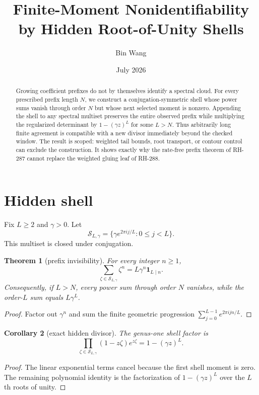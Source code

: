 \documentclass[11pt]{article}
\title{Finite-Moment Nonidentifiability by Hidden Root-of-Unity Shells}
\author{Bin Wang}\date{July 2026}
\newtheorem{theorem}{Theorem}[section]
\newtheorem{corollary}[theorem]{Corollary}
\theoremstyle{remark}\newtheorem{remark}[theorem]{Remark}
\begin{document}
\maketitle
\begin{abstract}
Growing coefficient prefixes do not by themselves identify a spectral cloud.
For every prescribed prefix length $N$, we construct a conjugation-symmetric
shell whose power sums vanish through order $N$ but whose next selected
moment is nonzero.  Appending the shell to any spectral multiset preserves
the entire observed prefix while multiplying the regularized determinant by
$1-(\gamma z)^L$ for some $L>N$.  Thus arbitrarily long finite agreement is
compatible with a new divisor immediately beyond the checked window.  The
result is scoped: weighted tail bounds, root transport, or contour control can
exclude the construction.  It shows exactly why the rate-free prefix theorem
of RH-287 cannot replace the weighted gluing leaf of RH-288.
\end{abstract}

\section{Hidden shell}
Fix $L\ge2$ and $\gamma>0$.  Let
\[
 \mathcal S_{L,\gamma}
 =\{\gamma e^{2\pi i j/L}:0\le j<L\}.
\]
This multiset is closed under conjugation.

\begin{theorem}[prefix invisibility]\label{thm:shell}
For every integer $n\ge1$,
\[
 \sum_{\zeta\in\mathcal S_{L,\gamma}}\zeta^n
 =L\gamma^n\mathbf1_{L\mid n}.
\]
Consequently, if $L>N$, every power sum through order $N$ vanishes, while
the order-$L$ sum equals $L\gamma^L$.
\end{theorem}
\begin{proof}
Factor out $\gamma^n$ and sum the finite geometric progression
$\sum_{j=0}^{L-1}e^{2\pi i jn/L}$.
\end{proof}

\begin{corollary}[exact hidden divisor]
The genus-one shell factor is
\[
 \prod_{\zeta\in\mathcal S_{L,\gamma}}
 (1-z\zeta)e^{z\zeta}=1-(\gamma z)^L.
\]
\end{corollary}
\begin{proof}
The linear exponential terms cancel because the first shell moment is zero.
The remaining polynomial identity is the factorization of
$1-(\gamma z)^L$ over the $L$th roots of unity.
\end{proof}
\end{document}
